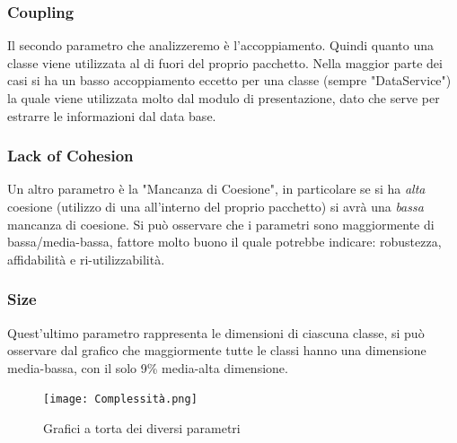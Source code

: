 \documentclass[12pt, letterpaper]{book}
\begin{document}
\subsubsection*{Coupling}
Il secondo parametro che analizzeremo è l'accoppiamento. Quindi quanto una classe viene utilizzata al di fuori del proprio pacchetto. Nella maggior parte dei casi si ha un basso accoppiamento eccetto per una classe (sempre "DataService") la quale viene utilizzata molto dal modulo di presentazione, dato che serve per estrarre le informazioni dal data base.
\subsubsection*{Lack of Cohesion}
Un altro parametro è la "Mancanza di Coesione", in particolare se si ha \textit{alta} coesione (utilizzo di una all'interno del proprio pacchetto) si avrà una \textit{bassa} mancanza di coesione.
Si può osservare che i parametri sono maggiormente di bassa/media-bassa, fattore molto buono il quale potrebbe indicare: robustezza, affidabilità e ri-utilizzabilità.
\subsubsection*{Size}
Quest'ultimo parametro rappresenta le dimensioni di ciascuna classe, si può osservare dal grafico che maggiormente tutte le classi hanno una dimensione media-bassa, con il solo 9\% media-alta dimensione.

\begin{figure}
    \centering
    \texttt{[image: Complessità.png]}
    \caption{Grafici a torta dei diversi parametri}
    \label{fig: graficiParametri}
\end{figure}
\end{document}
